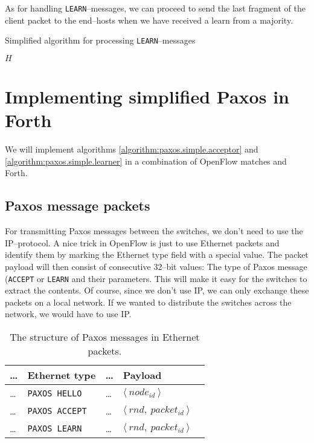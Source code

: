 As for handling \texttt{LEARN}--messages, we can proceed to send the last
fragment of the client packet to the end--hosts when we have received a
learn from a majority.

\begin{algorithm}
  \caption{Simplified algorithm for processing \texttt{LEARN}--messages}
  \label{algorithm:paxos.simple.learner}
  \begin{algorithmic}
    \State $H$ 
    \State

          \State {}
        \EndForIn
      \EndIf
    \EndOn
  \end{algorithmic}
\end{algorithm}

\section{Implementing simplified Paxos in Forth}

We will implement algorithms \ref{algorithm:paxos.simple.acceptor} 
and \ref{algorithm:paxos.simple.learner} in a combination of OpenFlow
matches and Forth.

\subsection{Paxos message packets}

For transmitting Paxos messages between the switches, we don't need to use
the IP--protocol.  A nice trick in OpenFlow is just to use Ethernet packets
and identify them by marking the Ethernet type field with a special value.
The packet payload will then consist of consecutive 32--bit values: The type of
Paxos message (\texttt{ACCEPT} or \texttt{LEARN} and their parameters.
This will make it easy for the switches to extract the contents.
Of course, since we don't use IP, we can only exchange these packets on a
local network.  If we wanted to distribute the switches across the network,
we would have to use IP.

\begin{table}[H]
  \centering
  \begin{tabular}{l|l|l|l|l|}
    \hline \dots & \textbf{Ethernet type} & \dots & \textbf{Payload} \\
    \hline \dots & \texttt{PAXOS HELLO}  & \dots & $ \langle\ node_{id}\ \rangle $ \\
    \hline \dots & \texttt{PAXOS ACCEPT} & \dots & $ \langle\ rnd,\ packet_{id}\ \rangle $ \\
    \hline \dots & \texttt{PAXOS LEARN}  & \dots & $ \langle\ rnd,\ packet_{id}\ \rangle $ \\
    \hline
  \end{tabular}

  \caption{The structure of Paxos messages in Ethernet packets.}
  \label{table:paxos.ethernet.packet}
\end{table}

